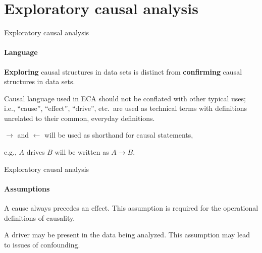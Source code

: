 \documentclass{beamer}
\begin{document}
\section{Exploratory causal analysis}
\begin{frame}{Exploratory causal analysis}
\framesubtitle{Language}

{\bf Exploring} causal structures in data sets is distinct from {\bf confirming} causal structures in data sets.
\vspace{0.25in}

Causal language used in ECA should not be conflated with other typical uses; i.e., ``cause'', ``effect'', ``drive'', etc.\ are used as technical terms with definitions unrelated to their common, everyday definitions.
\vspace{0.25in}
\pause

$\rightarrow$ and $\leftarrow$ will be used as shorthand for causal statements,

e.g., $A$ drives $B$ will be written as $A\rightarrow B$.
\end{frame}

\begin{frame}{Exploratory causal analysis}
\framesubtitle{Assumptions}

\begin{block}{A cause always precedes an effect.}
This assumption is required for the operational definitions of causality.
\end{block}
\vspace{0.5in}

\begin{block}{A driver may be present in the data being analyzed.}
This assumption may lead to issues of confounding.
\end{block}

\end{frame}
\end{document}
